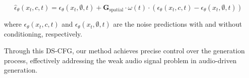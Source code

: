 \vspace{-1em}
\begin{equation}
\hat{\epsilon}_\theta(x_t, c, t) = \epsilon_\theta(x_t, \emptyset, t) + \mathbf{G}_{\text{spatial}} \cdot \omega(t) \cdot (\epsilon_\theta(x_t, c, t) - \epsilon_\theta(x_t, \emptyset, t))
\end{equation}
\vspace{-1em}

where $\epsilon_\theta(x_t, c, t)$ and $\epsilon_\theta(x_t, \emptyset, t)$ are the noise predictions with and without conditioning, respectively.

Through this DS-CFG, our method achieves precise control over the generation process, effectively addressing the weak audio signal problem in audio-driven generation.